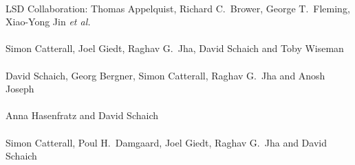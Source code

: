\begin{spacelist}
  \pagebreakitem
     \\
    LSD Collaboration: Thomas Appelquist, Richard C.~Brower, George T.~Fleming, Xiao-Yong Jin \textit{et al.} \\ %
  \pagebreakitem
     \\
    Simon Catterall, Joel Giedt, Raghav G.~Jha, David Schaich and Toby Wiseman \\
  \pagebreakitem
     \\
    David Schaich, Georg Bergner, Simon Catterall, Raghav G.~Jha and Anosh Joseph \\
  \pagebreakitem
     \\
    Anna Hasenfratz and David Schaich \\
  \pagebreakitem
     \\
    Simon Catterall, Poul H.~Damgaard, Joel Giedt, Raghav G.~Jha and David Schaich
\end{spacelist}
